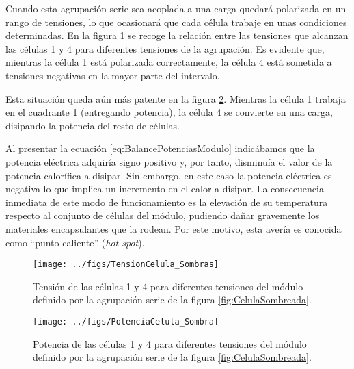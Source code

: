 Cuando esta agrupación serie sea acoplada a una carga quedará polarizada
en un rango de tensiones, lo que ocasionará que cada célula trabaje
en unas condiciones determinadas. En la figura \ref{fig:TensionesCelulaSombreada}
se recoge la relación entre las tensiones que alcanzan las células
1 y 4 para diferentes tensiones de la agrupación. Es evidente que,
mientras la célula 1 está polarizada correctamente, la célula 4 está
sometida a tensiones negativas en la mayor parte del intervalo. 

Esta situación queda aún más patente en la figura \ref{fig:PotenciaCelulasSombreada}.
Mientras la célula 1 trabaja en el cuadrante 1 (entregando potencia),
la célula 4 se convierte en una carga, disipando la potencia del resto
de células. 

Al presentar la ecuación \ref{eq:BalancePotenciasModulo} indicábamos
que la potencia eléctrica adquiría signo positivo y, por tanto, disminuía
el valor de la potencia calorífica a disipar. Sin embargo, en este
caso la potencia eléctrica es negativa lo que implica un incremento
en el calor a disipar. La consecuencia inmediata de este modo de funcionamiento
es la elevación de su temperatura respecto al conjunto de células
del módulo, pudiendo dañar gravemente los materiales encapsulantes
que la rodean. Por este motivo, esta avería es conocida como {}``punto
caliente'' (\emph{hot spot}).


\begin{figure}
\begin{centering}
\texttt{[image: ../figs/TensionCelula\_Sombras]}
\end{centering}

\caption{Tensión de las células 1 y 4 para diferentes tensiones del módulo
definido por la agrupación serie de la figura \ref{fig:CelulaSombreada}.\label{fig:TensionesCelulaSombreada}}

\end{figure}


\begin{figure}
\begin{centering}
\texttt{[image: ../figs/PotenciaCelula\_Sombra]}
\end{centering}

\caption{Potencia de las células 1 y 4 para diferentes tensiones del módulo
definido por la agrupación serie de la figura \ref{fig:CelulaSombreada}.\label{fig:PotenciaCelulasSombreada}}

\end{figure}


